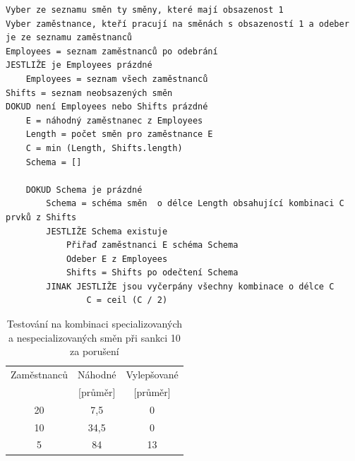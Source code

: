\documentclass[twoside]{ctuthesis}
\begin{document}
\begin{lstlisting}[caption={Pseudokód pro vylepšování obsazení všech směn}]
Vyber ze seznamu směn ty směny, které mají obsazenost 1
Vyber zaměstnance, kteří pracují na směnách s obsazeností 1 a odeber je ze seznamu zaměstnanců
Employees = seznam zaměstnanců po odebrání
JESTLIŽE je Employees prázdné
	Employees = seznam všech zaměstnanců
Shifts = seznam neobsazených směn
DOKUD není Employees nebo Shifts prázdné
	E = náhodný zaměstnanec z Employees
	Length = počet směn pro zaměstnance E
	C = min (Length, Shifts.length)
	Schema = []

	DOKUD Schema je prázdné
		Schema = schéma směn  o délce Length obsahující kombinaci C prvků z Shifts
		JESTLIŽE Schema existuje
			Přiřaď zaměstnanci E schéma Schema
			Odeber E z Employees
			Shifts = Shifts po odečtení Schema
		JINAK JESTLIŽE jsou vyčerpány všechny kombinace o délce C
				C = ceil (C / 2)
\end{lstlisting}




\begin{table}[h!]
\begin{tabular}{|c|c|c|}
	\hline
	Zaměstnanců & Náhodné & Vylepšované \\
	& [průměr] & [průměr] \\
	\hline
	20 & 7,5 & 0 \\
	10 & 34,5 & 0 \\
	5 & 84 & 13 \\
	\hline
\end{tabular}
	\caption{Testování na kombinaci specializovaných a nespecializovaných směn při sankci 10 za porušení}
	\label{tab:noemptyunspecialized}
\end{table}
\end{document}
